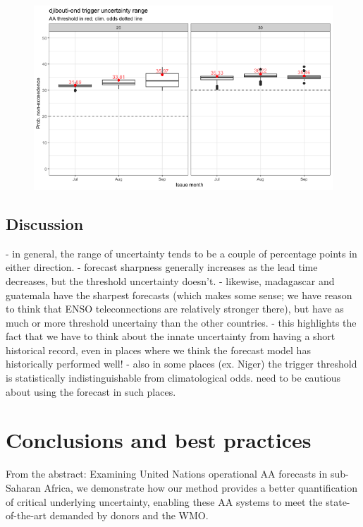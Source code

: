 \documentclass{ametsocV5}
\begin{document}
\begin{figure}
    \centering
    \includegraphics[width=0.9\linewidth]{figures/djibouti-ond.png}
\end{figure}

\subsection{Discussion}

- in general, the range of uncertainty tends to be a couple of percentage points in either direction.
- forecast sharpness generally increases as the lead time decreases, but the threshold uncertainty doesn't.
- likewise, madagascar and guatemala have the sharpest forecasts (which makes some sense; we have reason to think that ENSO teleconnections are relatively stronger there), but have as much or more threshold uncertainy than the other countries.
- this highlights the fact that we have to think about the innate uncertainty from having a short historical record, even in places where we think the forecast model has historically performed well!
- also in some places (ex. Niger) the trigger threshold is statistically indistinguishable from climatological odds. need to be cautious about using the forecast in such places.


\section{Conclusions and best practices}

From the abstract:  Examining United Nations operational AA forecasts in sub-Saharan Africa, we demonstrate how our method provides a better quantification of critical underlying uncertainty, enabling these AA systems to meet the state-of-the-art demanded by donors and the WMO.
\end{document}
